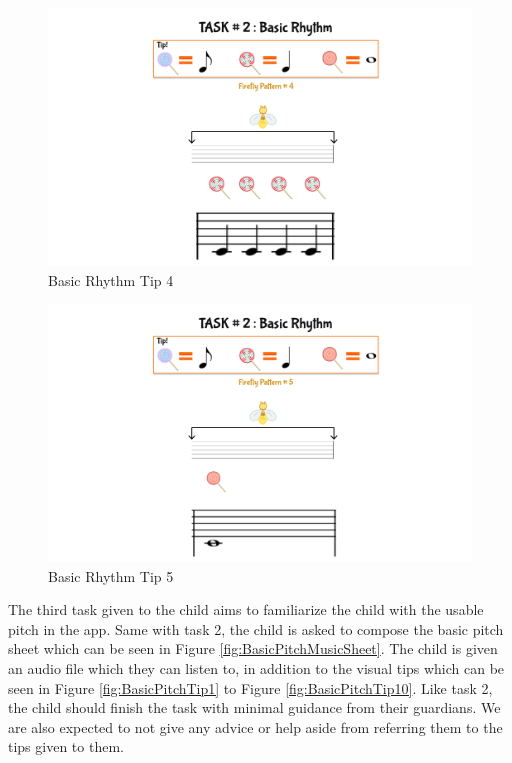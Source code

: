 \begin{figure}[H]
    \centering
    \includegraphics[width=15cm]{figures/NewFigures/BasicRhythmTip4.png}
    \caption{Basic Rhythm Tip 4}
    \label{fig:BasicRhythmTip4}
\end{figure}

\begin{figure}[H]
    \centering
    \includegraphics[width=15cm]{figures/NewFigures/BasicRhythmTip5.png}
    \caption{Basic Rhythm Tip 5}
    \label{fig:BasicRhythmTip5}
\end{figure}

The third task given to the child aims to familiarize the child with the usable pitch in the app. Same with task 2, the child is asked to compose the basic pitch sheet which can be seen in Figure \ref{fig:BasicPitchMusicSheet}. The child is given an audio file which they can listen to, in addition to the visual tips which can be seen in Figure \ref{fig:BasicPitchTip1} to Figure \ref{fig:BasicPitchTip10}. Like task 2, the child should finish the task with minimal guidance from their guardians. We are also expected to not give any advice or help aside from referring them to the tips given to them.

